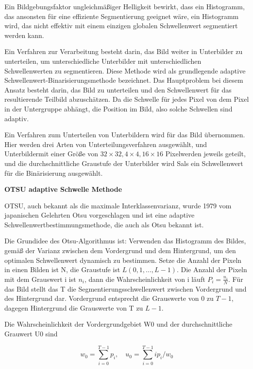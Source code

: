 Ein Bildgebungsfaktor ungleichmäßiger Helligkeit bewirkt, dass ein Histogramm, das ansonsten für eine effiziente Segmentierung geeignet wäre, ein Histogramm wird, das nicht effektiv mit einem einzigen globalen Schwellenwert segmentiert werden kann.

Ein Verfahren zur Verarbeitung besteht darin, das Bild weiter in Unterbilder zu unterteilen, um unterschiedliche Unterbilder mit unterschiedlichen Schwellenwerten zu segmentieren. Diese Methode wird als grundlegende adaptive Schwellenwert-Binarisierungsmethode bezeichnet. Das Hauptproblem bei diesem Ansatz besteht darin, das Bild zu unterteilen und den Schwellenwert für das resultierende Teilbild abzuschätzen. Da die Schwelle für jedes Pixel von dem Pixel in der Untergruppe abhängt, die Position im Bild, also solche Schwellen sind adaptiv. 

Ein Verfahren zum Unterteilen von Unterbildern wird für das Bild übernommen. Hier werden drei Arten von Unterteilungsverfahren ausgewählt, und Unterbildermit einer Größe von $ 32\times32,4 \times4,16\times16 $ Pixelwerden jeweils geteilt, und die durchschnittliche Graustufe der Unterbilder wird Sals ein Schwellenwert für die Binärisierung ausgewählt.


\textbf{OTSU adaptive Schwelle Methode}

OTSU\cite{Ostu}, auch bekannt als die maximale Interklassenvarianz, wurde 1979 vom japanischen Gelehrten Otsu vorgeschlagen und ist eine adaptive Schwellenwertbestimmungsmethode, die auch als Otsu bekannt ist.

Die Grundidee des Otsu-Algorithmus ist: Verwenden das Histogramm des Bildes, gemäß der Varianz zwischen dem Vordergrund und dem Hintergrund, um den optimalen Schwellenwert dynamisch zu bestimmen. Setze die Anzahl der Pixeln in einen Bilden ist N, die Graustufe ist $ L(0,1,...,L-1) $. Die Anzahl der Pixeln mit dem Grauswert i ist $ n_{i} $, dann die Wahrscheinlichkeit von i läuft $ P_{i} = \frac{n_{i}}{N} $. Für das Bild stellt das T die Segmentierungsschwellenwert zwischen Vordergrund und des Hintergrund dar. Vordergrund entsprecht die Grauswerte von 0 zu $ T-1 $, dagegen Hintergrund die Grauswerte von T zu $ L -1 $.

Die Wahrscheinlichkeit der Vordergrundgebiet W0 und der durchschnittliche Grauwert U0 sind

\begin{equation}
  w_{0} = \sum_{i=0}^{T-1} p_{i},\quad u_{0} = \sum_{i=0}^{T-1} ip_{i}/w_{0}
\end{equation}

